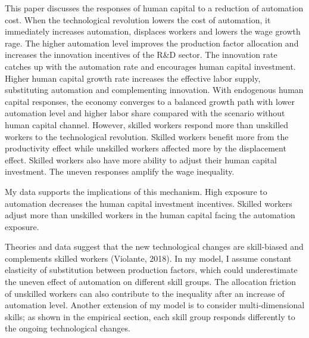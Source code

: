 \documentclass[12pt]{article}
\begin{document}
This paper discusses the responses of human capital to a reduction of automation cost. When the technological revolution lowers the cost of automation, it immediately increases automation, displaces workers and lowers the wage growth rage. The higher automation level improves the production factor allocation and increases the innovation incentives of the R\&D sector. The innovation rate catches up with the automation rate and encourages human capital investment. Higher human capital growth rate increases the effective labor supply, substituting automation and complementing innovation. With endogenous human capital responses, the economy converges to a balanced growth path with lower automation level and higher labor share compared with the scenario without human capital channel. However, skilled workers respond more than unskilled workers to the technological revolution. Skilled workers benefit more from the productivity effect while unskilled workers affected more by the displacement effect. Skilled workers also have more ability to adjust their human capital investment. The uneven responses amplify the wage inequality.

My data supports the implications of this mechanism. High exposure to automation decreases the human capital investment incentives. Skilled workers adjust more than unskilled workers in the human capital facing the automation exposure. 

Theories and data suggest that the new technological changes are skill-biased and complements skilled workers (Violante, 2018\nocite{Violante2008}). In my model, I assume constant elasticity of substitution between production factors, which could underestimate the uneven effect of automation on different skill groups. The allocation friction of unskilled workers can also contribute to the inequality after an increase of automation level. Another extension of my model is to consider multi-dimensional skills; as shown in the empirical section, each skill group responds differently to the ongoing technological changes. 

\clearpage


\clearpage
\end{document}
